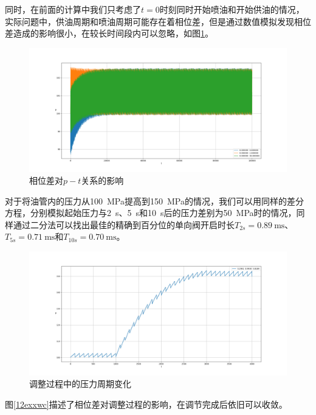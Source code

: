 \documentclass[12pt,AutoFakeBold]{article}%
\begin{document}
    同时，在前面的计算中我们只考虑了$t=0$时刻同时开始喷油和开始供油的情况，实际问题中，供油周期和喷油周期可能存在着相位差，但是通过数值模拟发现相位差造成的影响很小，在较长时间段内可以忽略，如图\ref{11exxwc}。\par
    \begin{figure}[H]
        \centering
        \includegraphics[scale=0.32]{figure/11-exxwc.png}
        \caption{相位差对$p-t$关系的影响}
        \label{11exxwc}
    \end{figure}
    对于将油管内的压力从\SI{100}{\MPa}提高到\SI{150}{\MPa}的情况，我们可以用同样的差分方程，分别模拟起始压力与\SI{2}{\s}、\SI{5}{\s}和\SI{10}{\s}后的压力差别为\SI{50}{\MPa}时的情况，同样通过二分法可以找出最佳的精确到百分位的单向阀开启时长$T_{2s}=\SI{0.89}{\ms}$、$T_{5s}=\SI{0.71}{\ms}$和$T_{10s}=\SI{0.70}{\ms}$。\par
    \begin{figure}[H]
        \centering
        \includegraphics[scale=0.32]{figure/13-1-t.png}
        \caption{调整过程中的压力周期变化}
        \label{adjustpress}
    \end{figure}
    图\ref{12exxwc}描述了相位差对调整过程的影响，在调节完成后依旧可以收敛。\par
\end{document}
